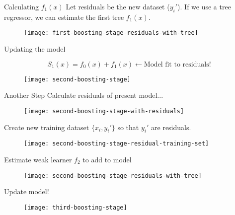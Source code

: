 \begin{frame}{Calculating $f_1(x)$}
Let residuals be the new dataset ($y_i'$). If we use a tree regressor, we can estimate the first tree $f_1(x)$. 

  \begin{figure}
    \texttt{[image: first-boosting-stage-residuals-with-tree]}
  \end{figure}

\end{frame}
%

\begin{frame}{Updating the model}

$$S_1(x) = f_0(x) + f_1(x) \leftarrow \text{Model fit to residuals!}$$

  \begin{figure}
    \texttt{[image: second-boosting-stage]}
  \end{figure}
  
\end{frame}
%

\begin{frame}{Another Step}
Calculate residuals of present model...

  \begin{figure}
    \texttt{[image: second-boosting-stage-with-residuals]}
  \end{figure}
  
\end{frame}
%

\begin{frame}
Create new training dataset $\{ x_i, y_i' \}$ so that $y_i'$ are residuals.

  \begin{figure}
    \texttt{[image: second-boosting-stage-residual-training-set]}
  \end{figure}
  
\end{frame}
%

\begin{frame}
Estimate weak learner $f_2$ to add to model

  \begin{figure}
    \texttt{[image: second-boosting-stage-residuals-with-tree]}
  \end{figure}
  
\end{frame}
%

\begin{frame}
Update model!

  \begin{figure}
    \texttt{[image: third-boosting-stage]}
  \end{figure}
  
\end{frame}
%


